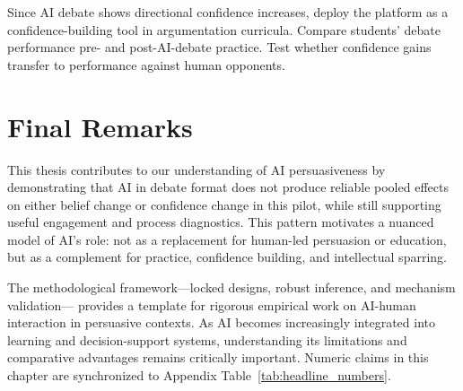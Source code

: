 Since AI debate shows directional confidence increases, deploy the platform as a confidence-building tool in
argumentation curricula. Compare students' debate performance pre- and post-AI-debate practice.
Test whether confidence gains transfer to performance against human opponents.

\pagebreak
\section{Final Remarks}

This thesis contributes to our understanding of AI persuasiveness by demonstrating that
AI in debate format does not produce reliable pooled effects on either belief change or confidence change
in this pilot, while still supporting useful engagement and process diagnostics.
This pattern motivates a nuanced model of AI's role:
not as a replacement for human-led persuasion or education, but as a complement for practice,
confidence building, and intellectual sparring.

The methodological framework---locked designs, robust inference, and mechanism validation---
provides a template for rigorous empirical work on AI-human interaction in persuasive contexts.
As AI becomes increasingly integrated into learning and decision-support systems,
understanding its limitations and comparative advantages remains critically important.
Numeric claims in this chapter are synchronized to Appendix
Table~\ref{tab:headline_numbers}.
